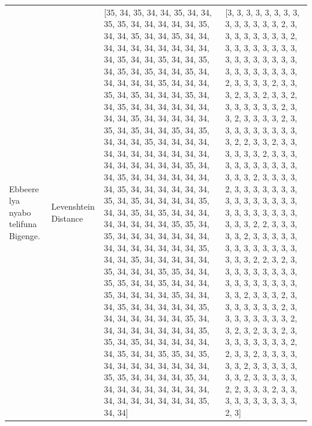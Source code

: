 \begin{tabular}{llll}
\multirow[t]{4}{*}{Ebbeere lya nyabo telifuna Bigenge.} & Levenshtein Distance & [35, 34, 35, 34, 34, 35, 34, 34, 35, 35, 34, 34, 34, 34, 34, 35, 34, 34, 35, 34, 34, 35, 34, 34, 34, 34, 34, 34, 34, 34, 34, 34, 34, 35, 34, 34, 35, 34, 34, 35, 34, 35, 34, 35, 34, 34, 35, 34, 34, 34, 34, 34, 35, 34, 34, 34, 35, 34, 35, 34, 34, 34, 35, 34, 34, 35, 34, 34, 34, 34, 34, 34, 34, 34, 35, 34, 34, 34, 34, 34, 35, 34, 35, 34, 34, 35, 34, 35, 34, 34, 34, 35, 34, 34, 34, 34, 34, 34, 34, 34, 34, 34, 34, 34, 34, 34, 34, 34, 34, 34, 35, 34, 34, 35, 34, 34, 34, 34, 34, 34, 34, 35, 34, 34, 34, 34, 34, 34, 35, 34, 35, 34, 34, 34, 34, 35, 34, 34, 35, 34, 35, 34, 34, 34, 34, 34, 34, 34, 34, 35, 35, 34, 35, 34, 34, 34, 34, 34, 34, 34, 34, 34, 34, 34, 34, 34, 34, 35, 34, 34, 35, 34, 34, 34, 34, 34, 35, 34, 34, 34, 35, 35, 34, 34, 35, 35, 34, 34, 35, 34, 34, 34, 35, 34, 34, 34, 34, 35, 34, 34, 34, 35, 34, 34, 34, 34, 34, 35, 34, 34, 34, 34, 34, 34, 35, 34, 34, 34, 34, 34, 34, 34, 34, 35, 35, 34, 35, 34, 34, 34, 34, 34, 34, 35, 34, 34, 35, 35, 34, 35, 34, 34, 34, 34, 34, 34, 34, 34, 35, 35, 34, 34, 34, 34, 35, 34, 34, 34, 34, 34, 34, 34, 34, 34, 34, 34, 34, 34, 34, 34, 34, 35, 34, 34] & [3, 3, 3, 3, 3, 3, 3, 3, 3, 3, 3, 3, 3, 3, 2, 3, 3, 3, 3, 3, 3, 3, 3, 2, 3, 3, 3, 3, 3, 3, 3, 3, 3, 3, 3, 3, 3, 3, 3, 3, 3, 3, 3, 3, 3, 3, 3, 3, 2, 3, 3, 3, 3, 2, 3, 3, 3, 2, 3, 3, 2, 3, 3, 2, 3, 3, 3, 3, 3, 3, 2, 3, 3, 2, 3, 3, 3, 3, 2, 3, 3, 3, 3, 3, 3, 3, 3, 3, 3, 2, 2, 3, 3, 2, 3, 3, 3, 3, 3, 3, 2, 3, 3, 3, 3, 3, 3, 3, 3, 3, 3, 3, 3, 3, 3, 2, 3, 3, 3, 3, 2, 3, 3, 3, 3, 3, 3, 3, 3, 3, 3, 3, 3, 3, 3, 3, 3, 3, 3, 3, 3, 3, 3, 3, 3, 3, 3, 2, 2, 3, 3, 3, 3, 3, 2, 3, 3, 3, 3, 3, 3, 3, 3, 3, 3, 3, 3, 3, 3, 3, 3, 2, 2, 3, 2, 3, 3, 3, 3, 3, 3, 3, 3, 3, 3, 3, 3, 3, 3, 3, 3, 3, 3, 3, 2, 3, 3, 3, 2, 3, 3, 3, 3, 3, 3, 3, 2, 3, 3, 3, 3, 3, 3, 3, 3, 2, 3, 2, 3, 2, 3, 3, 2, 3, 3, 3, 3, 3, 3, 3, 3, 2, 2, 3, 3, 2, 3, 3, 3, 3, 3, 3, 2, 3, 3, 3, 3, 3, 3, 3, 2, 3, 3, 3, 3, 3, 2, 2, 3, 3, 3, 2, 3, 3, 3, 3, 3, 3, 3, 3, 3, 3, 2, 3] \\

\end{tabular}
